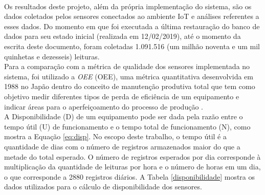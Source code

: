
%
\\\null \quad Os resultados deste projeto, além da própria implementação do sistema, são os dados coletados pelos sensores conectados ao ambiente \acrshort{IoT} e análises referentes a esses dados.
 Do momento em que foi executada a última restauração do banco de dados para seu estado inicial (realizada em 12/02/2019), até o momento da escrita deste documento, foram coletadas 1.091.516 (um milhão noventa e um mil quinhetas e dezesseis) leituras.
\\\null \quad Para a comparação com a métrica de qualidade dos sensores implementada no sistema, foi utilizado a \textit{\acrlong{OEE}} (\acrshort{OEE}), uma métrica quantitativa desenvolvida em 1988 no Japão dentro do conceito de manutenção produtiva total que tem como objetivo medir diferentes tipos de perda de eficiência de um equipamento e indicar áreas para o aperfeiçoamento do processo de produção \cite{artigoOEE}.
\\\null \quad A Disponibilidade (D) de um equipamento pode ser dada pela razão entre o tempo útil (U) de funcionamento e o tempo total de funcionamento (N), como mostra a Equação \ref{eq:disp}. No escopo deste trabalho, o tempo útil é a quantidade de dias com o número de registros armazenados maior do que a metade do total esperado. O número de registros esperados por dia corresponde à multiplicação da quantidade de leituras por hora e o número de horas em um dia, o que corresponde a 2880 registros diários. A Tabela \ref{disponibilidade} mostra os dados utilizados para o cálculo de disponibilidade dos sensores.

